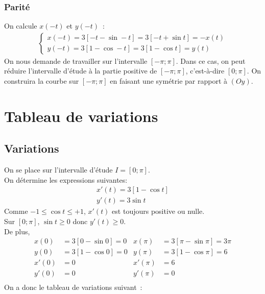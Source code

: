 \documentclass{article}
\begin{document}
\subsubsection{Parité}
On calcule $x(-t)$ et $y(-t)$~:
\begin{align*}
\left\{%
\begin{array}{l}
        x(-t) = 3[-t-\sin -t] = 3[-t+\sin t]=-x(t)\\
        y(-t) = 3[1-\cos -t] = 3[1-\cos t]=y(t)
\end{array}%
\right.
\end{align*}
On nous demande de travailler sur l'intervalle $[-\pi;\pi]$.
Dans ce cas, on peut réduire l'intervalle d'étude à la partie positive de $[-\pi;\pi]$, c'est-à-dire
$[0;\pi]$.
On construira la courbe sur $[-\pi;\pi]$ en faisant une symétrie par rapport à $(Oy)$.
\section{Tableau de variations}
\subsection{Variations}
On se place sur l'intervalle d'étude $I=[0;\pi]$.\\
On détermine les expressions suivantes:
\begin{align*}
        x'(t) = 3[1-\cos t]\\
        y'(t) = 3\sin t
\end{align*}
Comme $-1\le\cos t\le+1$, $x'(t)$ est toujours positive ou nulle.\\
Sur $[0;\pi]$, $\sin t\ge 0$ donc $y'(t)\ge 0$.\\
De plus,
\begin{align*}
        x (0) & = 3[0-\sin 0] = 0 & x (\pi) & = 3[\pi - \sin \pi] = 3\pi\\
        y (0) & = 3[1-\cos 0] = 0 & y (\pi) & = 3[1   - \cos \pi] = 6\\
        x'(0) & = 0               & x'(\pi) & = 6                    \\
        y'(0) & = 0               & y'(\pi) & = 0                    \\
\end{align*}
On a donc le tableau de variations suivant~:\\
\end{document}

